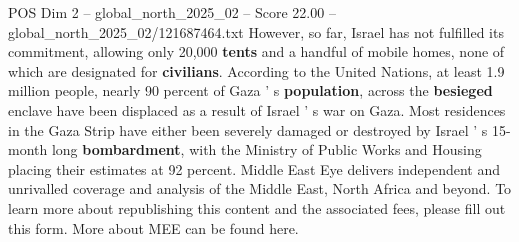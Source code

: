 \begin{textsample}{POS Dim 2 – global\_north\_2025\_02 – Score 22.00 – global\_north\_2025\_02/121687464.txt}
However, so far, Israel has not fulfilled its commitment, allowing only 20,000 \textbf{tents} and a handful of mobile homes, none of which are designated for \textbf{civilians}.
According to the United Nations, at least 1.9 million people, nearly 90 percent of Gaza ' s \textbf{population}, across the \textbf{besieged} enclave have been displaced as a result of Israel ' s war on Gaza.
Most residences in the Gaza Strip have either been severely damaged or destroyed by Israel ' s 15-month long \textbf{bombardment}, with the Ministry of Public Works and Housing placing their estimates at 92 percent.
Middle East Eye delivers independent and unrivalled coverage and analysis of the Middle East, North Africa and beyond.
To learn more about republishing this content and the associated fees, please fill out this form.
More about MEE can be found here.

\end{textsample}
